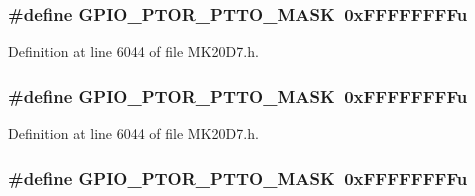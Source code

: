 \subsubsection[{\texorpdfstring{G\+P\+I\+O\+\_\+\+P\+T\+O\+R\+\_\+\+P\+T\+T\+O\+\_\+\+M\+A\+SK}{GPIO_PTOR_PTTO_MASK}}]{\setlength{\rightskip}{0pt plus 5cm}\#define G\+P\+I\+O\+\_\+\+P\+T\+O\+R\+\_\+\+P\+T\+T\+O\+\_\+\+M\+A\+SK~0x\+F\+F\+F\+F\+F\+F\+F\+Fu}\hypertarget{group___g_p_i_o___register___masks_gaa75953b5d9d23bdaa6c24232e1a52680}{}\label{group___g_p_i_o___register___masks_gaa75953b5d9d23bdaa6c24232e1a52680}


Definition at line 6044 of file M\+K20\+D7.\+h.

\subsubsection[{\texorpdfstring{G\+P\+I\+O\+\_\+\+P\+T\+O\+R\+\_\+\+P\+T\+T\+O\+\_\+\+M\+A\+SK}{GPIO_PTOR_PTTO_MASK}}]{\setlength{\rightskip}{0pt plus 5cm}\#define G\+P\+I\+O\+\_\+\+P\+T\+O\+R\+\_\+\+P\+T\+T\+O\+\_\+\+M\+A\+SK~0x\+F\+F\+F\+F\+F\+F\+F\+Fu}\hypertarget{group___g_p_i_o___register___masks_gaa75953b5d9d23bdaa6c24232e1a52680}{}\label{group___g_p_i_o___register___masks_gaa75953b5d9d23bdaa6c24232e1a52680}


Definition at line 6044 of file M\+K20\+D7.\+h.

\subsubsection[{\texorpdfstring{G\+P\+I\+O\+\_\+\+P\+T\+O\+R\+\_\+\+P\+T\+T\+O\+\_\+\+M\+A\+SK}{GPIO_PTOR_PTTO_MASK}}]{\setlength{\rightskip}{0pt plus 5cm}\#define G\+P\+I\+O\+\_\+\+P\+T\+O\+R\+\_\+\+P\+T\+T\+O\+\_\+\+M\+A\+SK~0x\+F\+F\+F\+F\+F\+F\+F\+Fu}\hypertarget{group___g_p_i_o___register___masks_gaa75953b5d9d23bdaa6c24232e1a52680}{}\label{group___g_p_i_o___register___masks_gaa75953b5d9d23bdaa6c24232e1a52680}


